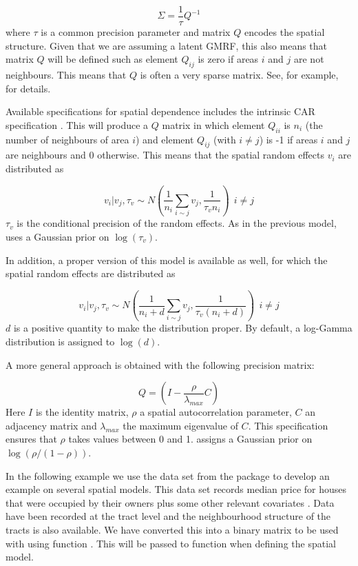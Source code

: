 \documentclass[article]{jss}
\begin{document}
\begin{equation}
\Sigma = \frac{1}{\tau} Q^{-1}
\end{equation}
\noindent
where $\tau$ is a common precision parameter and matrix $Q$ encodes
the spatial structure. Given that we are assuming a latent GMRF, this also
means that matrix $Q$ will be defined such as element $Q_{ij}$ is zero if
areas $i$ and $j$ are not neighbours. This means that $Q$ is often a very
sparse matrix. See, for example, \citet{rueheld:2005} 
for details.

Available specifications for spatial dependence includes the intrinsic CAR
specification \citep{besagetal:1991}. This will produce a $Q$ matrix in which
element $Q_{ii}$ is $n_i$ (the number of neighbours of area $i$) and element
$Q_{ij}$ (with $i\neq j$) is -1 if areas $i$ and $j$ are neighbours and 0 otherwise. This
means that the spatial random effects $v_i$ are distributed as

\begin{equation}
v_i|v_j,\tau_v \sim  N( \frac{1}{n_i}\sum_{i\sim j} v_j, \frac{1}{\tau_vn_i})\ \  i\neq j
\end{equation}
\noindent
$\tau_v$ is the conditional precision of the random effects. As in the previous
model,  uses a Gaussian prior on $\log(\tau_v)$.

In addition, a proper version of this model is available as well,
for which the spatial random effects are distributed as

\begin{equation}
v_i|v_j,\tau_v \sim  N( \frac{1}{n_i+d}\sum_{i\sim j} v_j, \frac{1}{\tau_v(n_i+d)})\ \ i\neq j
\end{equation}
\noindent
$d$ is a positive quantity to make the distribution proper. By default,
a log-Gamma distribution is assigned to $\log(d)$.

A more general approach is obtained  with the following precision
matrix:

\begin{equation}
Q = (I - \frac{\rho}{\lambda_{max}}C)
\end{equation}
\noindent
Here $I$ is the identity matrix, $\rho$ a spatial autocorrelation parameter,
$C$ an adjacency matrix and $\lambda_{max}$ the maximum eigenvalue of $C$.
This specification ensures that $\rho$ takes values between 0 and 1.
 assigns a Gaussian prior on $\log(\rho/(1-\rho))$.

In the following example we use the  data set from the
 package  \citep{spdep:2013} to develop an example on several spatial
models.  This data set  records median price for houses that were occupied by
their owners plus some other relevant covariates \citep[see,][for
details]{HarrisonRubinfeld:1978}. Data have been recorded at the tract level
and the neighbourhood structure of the tracts is also available.
We have converted this into a binary matrix to be used with 
using function . This will be passed to function  when
defining the spatial model.
\end{document}
